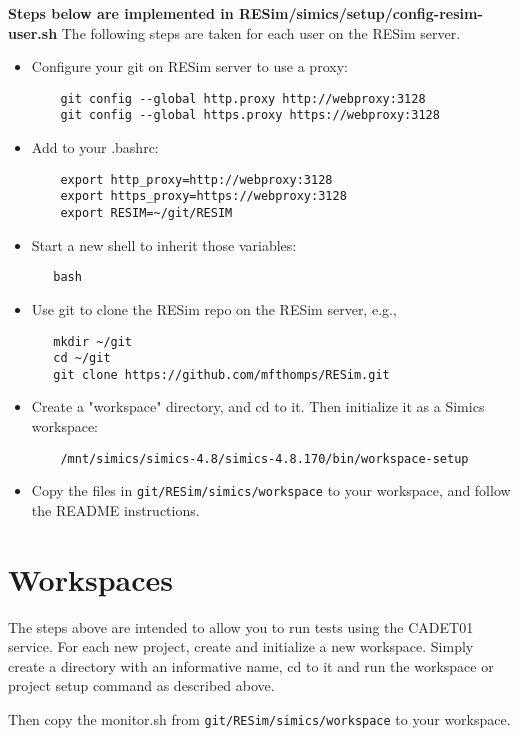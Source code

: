 \documentclass[titlepage]{article}
\begin{document}
\textbf{Steps below are implemented in RESim/simics/setup/config-resim-user.sh}
The following steps are taken for each user on the RESim server.
\begin{itemize}
\item Configure your git on RESim server to use a proxy:
\begin{verbatim}
    git config --global http.proxy http://webproxy:3128
    git config --global https.proxy https://webproxy:3128
\end{verbatim}

\item Add to your .bashrc:
\begin{verbatim}
    export http_proxy=http://webproxy:3128
    export https_proxy=https://webproxy:3128
    export RESIM=~/git/RESIM
\end{verbatim}
\item Start a new shell to inherit those variables:
\begin{verbatim}
   bash
\end{verbatim}

\item Use git to clone the RESim repo on the RESim server, e.g., 
\begin{verbatim}
   mkdir ~/git
   cd ~/git
   git clone https://github.com/mfthomps/RESim.git
\end{verbatim}

\item Create a "workspace" directory, and cd to it.  Then initialize
it as a Simics workspace:
\begin{verbatim}
    /mnt/simics/simics-4.8/simics-4.8.170/bin/workspace-setup
\end{verbatim}


\item Copy the files in {\tt git/RESim/simics/workspace} to your workspace, and follow the README instructions.
\end{itemize}

\section{Workspaces}
The steps above are intended to allow you to run tests using the CADET01 service. 
For each new project, create and initialize a new workspace.  Simply create a directory
with an informative name, cd to it and run the workspace or project setup command as described above.

Then copy the monitor.sh from {\tt git/RESim/simics/workspace} to your workspace.
\end{document}
